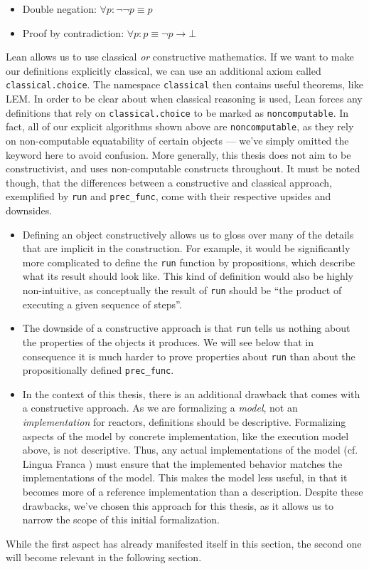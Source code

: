\begin{itemize}
  \item Double negation: $\forall p: \lnot \lnot p \equiv p$
  \item Proof by contradiction: $\forall p: p \equiv \lnot p \to \bot$
\end{itemize}

\noindent Lean allows us to use classical \emph{or} constructive mathematics.
If we want to make our definitions explicitly classical, we can use an additional axiom called \lstinline{classical.choice}.
The namespace \lstinline{classical} then contains useful theorems, like LEM.
In order to be clear about when classical reasoning is used, Lean forces any definitions that rely on \lstinline{classical.choice} to be marked as \verb|noncomputable|.
In fact, all of our explicit algorithms shown above are \verb|noncomputable|, as they rely on non-computable equatability of certain objects --- we've simply omitted the keyword here to avoid confusion.
More generally, this thesis does not aim to be constructivist, and uses non-computable constructs throughout.
It must be noted though, that the differences between a constructive and classical approach, exemplified by \lstinline{run} and \lstinline{prec_func}, come with their respective upsides and downsides.

\begin{itemize}
  \item Defining an object constructively allows us to gloss over many of the details that are implicit in the construction.
  For example, it would be significantly more complicated to define the \lstinline{run} function by propositions, which describe what its result should look like.
  This kind of definition would also be highly non-intuitive, as conceptually the result of \lstinline{run} should be ``the product of executing a given sequence of steps''.
  \item The downside of a constructive approach is that \lstinline{run} tells us nothing about the properties of the objects it produces.
  We will see below that in consequence it is much harder to prove properties about \lstinline{run} than about the propositionally defined \lstinline{prec_func}.
  \item In the context of this thesis, there is an additional drawback that comes with a constructive approach.
  As we are formalizing a \emph{model}, not an \emph{implementation} for reactors, definitions should be descriptive.
  Formalizing aspects of the model by concrete implementation, like the execution model above, is not descriptive.
  Thus, any actual implementations of the model (cf. Lingua Franca \cite{lf}) must ensure that the implemented behavior matches the implementations of the model.
  This makes the model less useful, in that it becomes more of a reference implementation than a description.
  Despite these drawbacks, we've chosen this approach for this thesis, as it allows us to narrow the scope of this initial formalization. 
\end{itemize}

\noindent While the first aspect has already manifested itself in this section, the second one will become relevant in the following section.